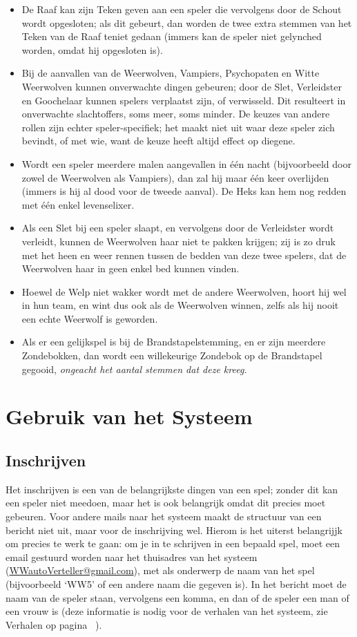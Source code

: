 \documentclass[12pt]{article}
\begin{document}
\begin{itemize}
  	\item De Raaf kan zijn Teken geven aan een speler die vervolgens door de Schout wordt opgesloten; als dit gebeurt, dan worden de twee extra stemmen van het Teken van de Raaf teniet gedaan (immers kan de speler niet gelynched worden, omdat hij opgesloten is).
  	\item Bij de aanvallen van de Weerwolven, Vampiers, Psychopaten en Witte Weerwolven kunnen onverwachte dingen gebeuren; door de Slet, Verleidster en Goochelaar kunnen spelers verplaatst zijn, of verwisseld. Dit resulteert in onverwachte slachtoffers, soms meer, soms minder. De keuzes van andere rollen zijn echter speler-specifiek; het maakt niet uit waar deze speler zich bevindt, of met wie, want de keuze heeft altijd effect op diegene.
  	\item Wordt een speler meerdere malen aangevallen in \'e\'en nacht (bijvoorbeeld door zowel de Weerwolven als Vampiers), dan zal hij maar \'e\'en keer overlijden (immers is hij al dood voor de tweede aanval). De Heks kan hem nog redden met \'e\'en enkel levenselixer.
  	\item Als een Slet bij een speler slaapt, en vervolgens door de Verleidster wordt verleidt, kunnen de Weerwolven haar niet te pakken krijgen; zij is zo druk met het heen en weer rennen tussen de bedden van deze twee spelers, dat de Weerwolven haar in geen enkel bed kunnen vinden.
  	\item Hoewel de Welp niet wakker wordt met de andere Weerwolven, hoort hij wel in hun team, en wint dus ook als de Weerwolven winnen, zelfs als hij nooit een echte Weerwolf is geworden.
  	\item Als er een gelijkspel is bij de Brandstapelstemming, en er zijn meerdere Zondebokken, dan wordt een willekeurige Zondebok op de Brandstapel gegooid, \emph{ongeacht het aantal stemmen dat deze kreeg.}
    \end{itemize}

\section{Gebruik van het Systeem}

  \subsection{Inschrijven}
  
    Het inschrijven is een van de belangrijkste dingen van een spel; zonder dit kan een speler niet meedoen, maar het is ook belangrijk omdat dit precies moet gebeuren. Voor andere mails naar het systeem maakt de structuur van een bericht niet uit, maar voor de inschrijving wel. Hierom is het uiterst belangrijjk om precies te werk te gaan: om je in te schrijven in een bepaald spel, moet een email gestuurd worden naar het thuisadres van het systeem (\href{mailto:<WWautoVerteller@gmail.com>}{WWautoVerteller@gmail.com}), met als onderwerp de naam van het spel (bijvoorbeeld `WW5' of een andere naam die gegeven is). In het bericht moet de naam van de speler staan, vervolgens een komma, en dan of de speler een man of een vrouw is (deze informatie is nodig voor de verhalen van het systeem, zie Verhalen op pagina~\pageref{subsec:verhalen} ).
    
\end{document}
